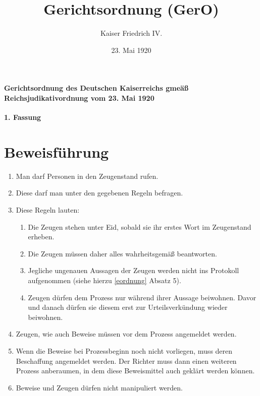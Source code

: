 \documentclass{article}
\title{Gerichtsordnung (GerO)}
\author{Kaiser Friedrich IV.}
\date{23. Mai 1920}
\begin{document}
\maketitle
\vspace*{\fill}
\paragraph{Gerichtsordnung des Deutschen Kaiserreichs gmeäß Reichsjudikativordnung vom 23. Mai 1920}

\newpage
{}
\vspace*{\fill}
\begin{Center}
\textbf{1. Fassung}
\vspace*{\fill}
\end{Center}
\newpage
\tableofcontents
\newpage
\section{Beweisführung}\label{zeugen}
\begin{enumerate}[(1)]
    \item Man darf Personen in den Zeugenstand rufen.
    \item Diese darf man unter den gegebenen Regeln befragen.
    \item Diese Regeln lauten:
        \begin{enumerate}[1.]
            \item Die Zeugen stehen unter Eid, sobald sie ihr erstes Wort im Zeugenstand erheben.
            \item Die Zeugen müssen daher alles wahrheitsgemäß beantworten.
            \item Jegliche ungenauen Aussagen der Zeugen werden nicht ins Protokoll aufgenommen (siehe hierzu \ref{eordnung} Absatz 5).
            \item Zeugen dürfen dem Prozess nur während ihrer Aussage beiwohnen. Davor und danach dürfen sie diesem erst zur Urteilsverkündung wieder beiwohnen.
        \end{enumerate}
    \item Zeugen, wie auch Beweise müssen vor dem Prozess angemeldet werden.
    \item Wenn die Beweise bei Prozessbeginn noch nicht vorliegen, muss deren Beschaffung angemeldet werden. Der Richter muss dann einen weiteren Prozess anberaumen, in dem diese Beweismittel auch geklärt werden können.
    \item Beweise und Zeugen dürfen nicht manipuliert werden.
\end{enumerate}
\end{document}

